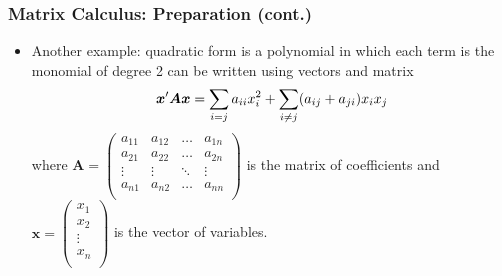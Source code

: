 \documentclass[pdflatex, 12pt]{beamer}
\begin{document}
\begin{frame}
\frametitle{Matrix Calculus: Preparation (cont.)}
\begin{itemize}
\item Another example: {\color{red} quadratic form} is a polynomial in which each term is the monomial of degree 2 can be written using vectors and matrix
 \begin{equation}
 \bm{x}'\bm{Ax} = \sum_{i = j} a_{ii} x_i^2 + \sum_{i \neq j} (a_{ij} + a_{ji}) x_i x_j \notag 
 \end{equation}
where {\small $\bm{A} = \begin{pmatrix}
a_{11} & a_{12} & \ldots & a_{1n} \\
a_{21} & a_{22} & \ldots & a_{2n} \\
\vdots & \vdots & \ddots & \vdots \\
a_{n1} & a_{n2} & \ldots & a_{nn} \\
\end{pmatrix}$} is the matrix of coefficients and {\small $\bm{x} = \begin{pmatrix}
x_1 \\
x_2 \\
\vdots \\
x_n \\
\end{pmatrix}$} is the vector of variables.
\end{itemize}
\end{frame}
\end{document}
